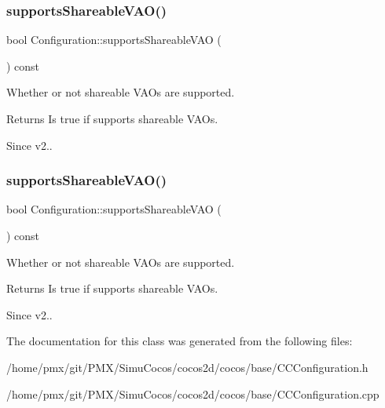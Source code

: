 \subsubsection{\texorpdfstring{supports\+Shareable\+V\+A\+O()}{supportsShareableVAO()}\hspace{0.1cm}{\footnotesize\ttfamily [1/2]}}
{\footnotesize\ttfamily bool Configuration\+::supports\+Shareable\+V\+AO (\begin{DoxyParamCaption}{ }\end{DoxyParamCaption}) const}

Whether or not shareable V\+A\+Os are supported.

\begin{DoxyReturn}{Returns}
Is true if supports shareable V\+A\+Os. 
\end{DoxyReturn}
\begin{DoxySince}{Since}
v2.. 
\end{DoxySince}
\mbox{\label{classConfiguration_acbd9837dcbd01d0e4994dd361b3e7671}} 
\subsubsection{\texorpdfstring{supports\+Shareable\+V\+A\+O()}{supportsShareableVAO()}\hspace{0.1cm}{\footnotesize\ttfamily [2/2]}}
{\footnotesize\ttfamily bool Configuration\+::supports\+Shareable\+V\+AO (\begin{DoxyParamCaption}{ }\end{DoxyParamCaption}) const}

Whether or not shareable V\+A\+Os are supported.

\begin{DoxyReturn}{Returns}
Is true if supports shareable V\+A\+Os. 
\end{DoxyReturn}
\begin{DoxySince}{Since}
v2.. 
\end{DoxySince}


The documentation for this class was generated from the following files\+:\begin{DoxyCompactItemize}
\item 
/home/pmx/git/\+P\+M\+X/\+Simu\+Cocos/cocos2d/cocos/base/C\+C\+Configuration.\+h\item 
/home/pmx/git/\+P\+M\+X/\+Simu\+Cocos/cocos2d/cocos/base/C\+C\+Configuration.\+cpp\end{DoxyCompactItemize}

